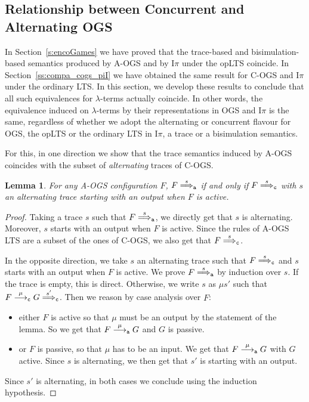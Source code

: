 \documentclass[11pt,a4paper]{amsart}
\theoremstyle{plain}
\theoremstyle{definition}
\theoremstyle{defC}
\theoremstyle{thmC}
\theoremstyle{plain}
\numberwithin{equation}{section}
\newcommand{\tr}{s}
\newcommand{\AOGS}{\mbox{{\rm A-OGS}}\xspace}      %
\newcommand{\COGS}{\mbox{{\rm C-OGS}}\xspace}      %
\newcommand{\rmm}[1]{{\tt{\lowercase{#1}}}}
\newcommand{\genarr}[2]{\mathrel{\stackrel{{#1}}{\longrightarrow}_{\rmm{\lowercase{#2}}}}}
\newcommand{\genArr}[2]{\mathrel{\stackrel{{#1}}{\Longrightarrow}_{\rmm{\lowercase{#2}}}}}  %
\newcommand{\arrA}[1]{\genarr{#1}{A}}  %
\newcommand{\ArrA}[1]{\genArr{#1}{A}}  %
\newcommand{\arrC}[1]{\genarr{#1}{C}}   %
\newcommand{\ArrC}[1]{\genArr{#1}{C}}   %
\newcommand{\opLTS}{opLTS\xspace}  %
\newcommand{\FF}{F}
\newcommand{\GG}{G}
\newcommand{\Intp}{\mbox{I$\pi$}\xspace}   %
\newcommand{\piI}{\Intp}   %
\newcommand{\act}{\mu}
\theoremstyle{plain}
\newtheorem{lemma}[thm]{Lemma}
\theoremstyle{definition}
\begin{document}
\subsection{Relationship between Concurrent and Alternating OGS}
\label{subsec:relate-conc-alt-lts}


In Section~\ref{s:encoGames} we have proved that the
trace-based and bisimulation-based semantics produced by
\AOGS and by \piI under the \opLTS coincide. 
In Section~\ref{ss:compa_cogs_piI} we have obtained the
same result for \COGS and \piI under the ordinary LTS.
In this section, we develop these results to conclude that
all such equivalences for $\lambda$-terms actually coincide.  In other words, the equivalence
induced on $\lambda$-terms by their representations in OGS and \piI is
the same, regardless of whether we adopt the alternating or concurrent
flavour for OGS, the \opLTS or the ordinary LTS in \piI, a trace or a
bisimulation semantics.

For this, in one direction we show that the trace semantics induced by
\AOGS coincides with the subset of \emph{alternating} traces of \COGS.
 
\begin{lemma}
\label{l:traces_AOGS_COGS}
For any \AOGS configuration $\FF$, 
$\FF \ArrA{\tr}$ if and only if $\FF \ArrC{\tr}$ with $\tr$ an alternating
trace starting with an output when $\FF$ is active.
\end{lemma} 

\begin{proof}
Taking a trace $\tr$ such that $\FF \ArrA{\tr}$,
we directly get that $\tr$ is alternating.
Moreover, $\tr$ starts with an output when $\FF$ is active.
Since the rules of \AOGS LTS are a subset of the ones of \COGS,
we also get that $\FF \ArrC{\tr}$.

In the opposite direction, 
we take $\tr$ an alternating trace such that 
$\FF \ArrC{\tr}$ and $\tr$ starts 
with an output when $\FF$ is active.
We prove $\FF \ArrA{\tr}$ by induction over $\tr$.
If the trace is empty, this is direct.
Otherwise, we write $\tr$ as $\act \tr'$ such that
$\FF \arrC{\act} \GG \ArrC{\tr'}$.
Then we reason by case analysis over $\FF$:
\begin{itemize}
  \item either $\FF$ is active so that $\act$ must be an output by the statement
  of the lemma.
  So we get that $\FF \arrA{\act} \GG$ and $\GG$ is passive.
  \item or $\FF$ is passive, so that $\act$ has to be an input.
  We get that  $\FF \arrA{\act} \GG$ with $\GG$ active.
  Since $\tr$ is alternating, we then get that $\tr'$ is
  starting with an output. 
\end{itemize}
Since $\tr'$ is alternating,
in both cases we conclude using the induction hypothesis.
\end{proof}
 
\end{document}
